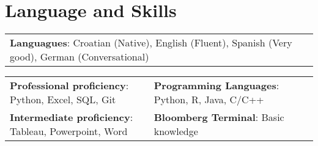 \documentclass[letterpaper,11pt]{article}
\makeatletter
\newcommand{\resumeItem}[1]{
  \item\small{
    {#1 \vspace{-2pt}}
  }
}
\newcommand{\resumeProjectHeading}[2]{
    \item
    \begin{tabular*}{0.97\textwidth}{l@{\extracolsep{\fill}}r}
      \small#1 & #2 \\
    \end{tabular*}\vspace{-7pt}
}
\newcommand{\resumeSubHeadingListStart}{\begin{itemize}[leftmargin=0.15in, label={}]}
\newcommand{\resumeSubHeadingListEnd}{\end{itemize}}
\newcommand{\resumeItemListStart}{\begin{itemize}}
\newcommand{\resumeItemListEnd}{\end{itemize}\vspace{-5pt}}
\makeatother
\begin{document}


%
\section{Language and Skills}
\begin{center}
\begin{tabularx}{0.96\textwidth} { 
  >{\raggedright\arraybackslash}X
}
  \small{\textbf{Languagues}: Croatian (Native), English (Fluent), Spanish (Very good), German (Conversational)}
\end{tabularx}
\end{center}

\begin{center}
\begin{tabularx}{0.96\textwidth} { 
  >{\raggedright\arraybackslash}X 
   >{\raggedright\arraybackslash}X 
   >{\raggedright\arraybackslash}X 
   >{\raggedright\arraybackslash}X
}
\small{\textbf{Professional proficiency}: Python, Excel, SQL, Git} & \small{\hspace{3pt}\textbf{Programming Languages}: Python, R, Java, C/C++} \\
\small{\textbf{Intermediate proficiency}: Tableau, Powerpoint, Word} & \small{\hspace{3pt}\textbf{Bloomberg Terminal}: Basic knowledge} \\
\end{tabularx}
\end{center}
\end{document}
